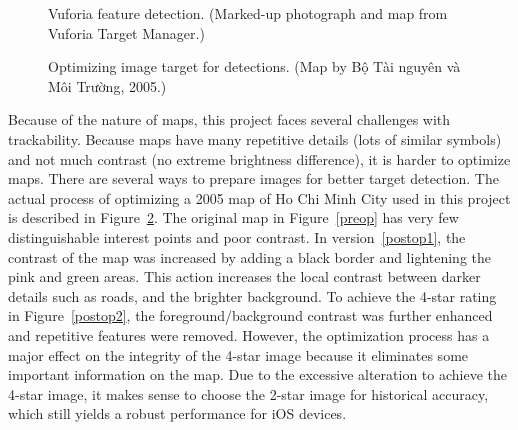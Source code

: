\begin{figure}[!ht]\centering
{}
\qquad
{}
\vspace{-.2 in}
\caption[Vuforia feature detection]{Vuforia feature detection. (Marked-up photograph and map from Vuforia Target Manager.)}\label{feature_ratings}
\end{figure}

\begin{figure}[!ht]\centering
{}
\qquad
{}
\vspace{-.2 in}
\caption[Optimizing image targets]{\vi Optimizing image target for detections. (Map by Bộ Tài nguyên và Môi Trường, 2005.\footnotemark)}\label{optimize}
\end{figure}

\vi Because of the nature of maps, this project faces several challenges with trackability. Because maps have many repetitive details (lots of similar symbols) and not much contrast (no extreme brightness difference), it is harder to optimize maps. There are several ways to prepare images for better target detection. The actual process of optimizing a 2005 map of Ho Chi Minh City used in this project is described in Figure~\ref{optimize}. The original map in Figure~\ref{preop} has very few distinguishable interest points and poor contrast. In version~\ref{postop1}, the contrast of the map was  increased by adding a black border and lightening the pink and green areas. This action increases the local contrast between darker details such as roads, and the brighter background. To achieve the 4-star rating in Figure~\ref{postop2}, the foreground/background contrast was further enhanced and repetitive features were removed. However, the optimization process has a major effect on the integrity of the 4-star image because it eliminates some important information on the map. Due to the excessive alteration to achieve the 4-star image, it makes sense to choose the 2-star image for historical accuracy, which still yields a robust performance for iOS devices. \en

